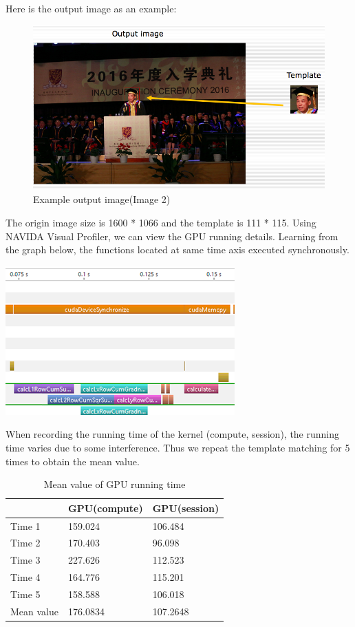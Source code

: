 \documentclass[12pt, a4paper]{article}
\begin{document}
Here is the output image as an example:
\begin{figure}[h]
    \includegraphics[scale=0.5]{image/output.png}
\caption{Example output image(Image 2)}
\end{figure}
The origin image size is 1600 * 1066 and the template is 111 * 115.
Using NAVIDA Visual Profiler, we can view the GPU running details. Learning from the graph below, the 
functions located at same time axis executed synchronously. 

    \includegraphics[scale=1.0]{image/example1.png}

When recording the running time of the kernel (compute, session), the running time varies due to some 
interference. Thus we repeat the template matching for 5 times to obtain the mean value. 

\begin{table}[!htbp]
\caption{Mean value of GPU running time}
\begin{tabular*}{12cm}{lll}
\hline
 &GPU(compute)  & GPU(session)   \\
\hline
Time 1 & 159.024 &	106.484\\
Time 2 &170.403 &	96.098\\
Time 3 &227.626 &	112.523\\
Time 4 &164.776 &	115.201\\
Time 5 &158.588 &	106.018\\
\hline
Mean value &176.0834 & 107.2648\\
\hline
\end{tabular*}
\end{table}
\end{document}
